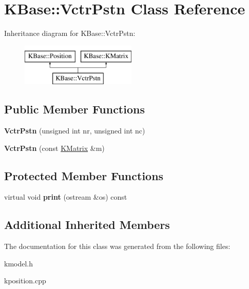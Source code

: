 \hypertarget{class_k_base_1_1_vctr_pstn}{\section{K\-Base\-:\-:Vctr\-Pstn Class Reference}
\label{class_k_base_1_1_vctr_pstn}
}
Inheritance diagram for K\-Base\-:\-:Vctr\-Pstn\-:\begin{figure}[H]
\begin{center}
\leavevmode
\includegraphics[height=2.000000cm]{class_k_base_1_1_vctr_pstn}
\end{center}
\end{figure}
\subsection*{Public Member Functions}
\begin{DoxyCompactItemize}
\item 
\hypertarget{class_k_base_1_1_vctr_pstn_a662f7ab962cbd356ab2429afc27a7b05}{{\bfseries Vctr\-Pstn} (unsigned int nr, unsigned int nc)}\label{class_k_base_1_1_vctr_pstn_a662f7ab962cbd356ab2429afc27a7b05}

\item 
\hypertarget{class_k_base_1_1_vctr_pstn_ad3e073c7a651c7d69a931cdcbf73586d}{{\bfseries Vctr\-Pstn} (const \hyperlink{class_k_base_1_1_k_matrix}{K\-Matrix} \&m)}\label{class_k_base_1_1_vctr_pstn_ad3e073c7a651c7d69a931cdcbf73586d}

\end{DoxyCompactItemize}
\subsection*{Protected Member Functions}
\begin{DoxyCompactItemize}
\item 
\hypertarget{class_k_base_1_1_vctr_pstn_acf76fb21e89a3a4d12444767562ddca5}{virtual void {\bfseries print} (ostream \&os) const }\label{class_k_base_1_1_vctr_pstn_acf76fb21e89a3a4d12444767562ddca5}

\end{DoxyCompactItemize}
\subsection*{Additional Inherited Members}


The documentation for this class was generated from the following files\-:\begin{DoxyCompactItemize}
\item 
kmodel.\-h\item 
kposition.\-cpp\end{DoxyCompactItemize}
